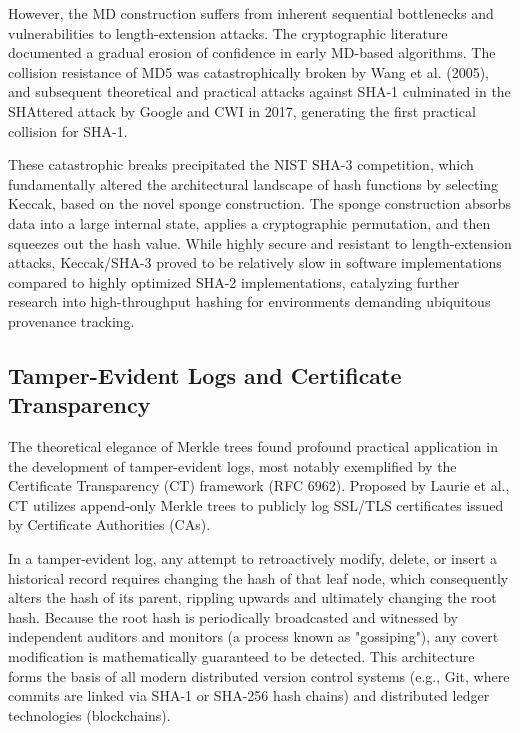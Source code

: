 However, the MD construction suffers from inherent sequential bottlenecks and vulnerabilities to length-extension attacks. The cryptographic literature documented a gradual erosion of confidence in early MD-based algorithms. The collision resistance of MD5 was catastrophically broken by Wang et al. (2005), and subsequent theoretical and practical attacks against SHA-1 culminated in the SHAttered attack by Google and CWI in 2017, generating the first practical collision for SHA-1.

These catastrophic breaks precipitated the NIST SHA-3 competition, which fundamentally altered the architectural landscape of hash functions by selecting Keccak, based on the novel sponge construction. The sponge construction absorbs data into a large internal state, applies a cryptographic permutation, and then squeezes out the hash value. While highly secure and resistant to length-extension attacks, Keccak/SHA-3 proved to be relatively slow in software implementations compared to highly optimized SHA-2 implementations, catalyzing further research into high-throughput hashing for environments demanding ubiquitous provenance tracking.

\subsection{Tamper-Evident Logs and Certificate Transparency}
The theoretical elegance of Merkle trees found profound practical application in the development of tamper-evident logs, most notably exemplified by the Certificate Transparency (CT) framework (RFC 6962). Proposed by Laurie et al., CT utilizes append-only Merkle trees to publicly log SSL/TLS certificates issued by Certificate Authorities (CAs). 

In a tamper-evident log, any attempt to retroactively modify, delete, or insert a historical record requires changing the hash of that leaf node, which consequently alters the hash of its parent, rippling upwards and ultimately changing the root hash. Because the root hash is periodically broadcasted and witnessed by independent auditors and monitors (a process known as "gossiping"), any covert modification is mathematically guaranteed to be detected. This architecture forms the basis of all modern distributed version control systems (e.g., Git, where commits are linked via SHA-1 or SHA-256 hash chains) and distributed ledger technologies (blockchains).

\label{sec:blake3}

